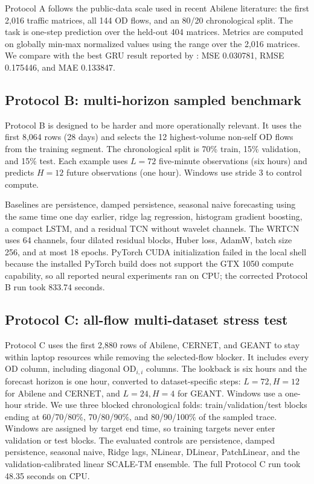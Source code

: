 \documentclass{article}
\begin{document}
Protocol A follows the public-data scale used in recent Abilene literature: the first 2,016 traffic matrices, all 144 OD flows, and an 80/20 chronological split. The task is one-step prediction over the held-out 404 matrices. Metrics are computed on globally min-max normalized values using the range over the 2,016 matrices. We compare with the best GRU result reported by \citet{kablaoui2024images}: MSE 0.030781, RMSE 0.175446, and MAE 0.133847.

\subsection{Protocol B: multi-horizon sampled benchmark}

Protocol B is designed to be harder and more operationally relevant. It uses the first 8,064 rows (28 days) and selects the 12 highest-volume non-self OD flows from the training segment. The chronological split is 70\% train, 15\% validation, and 15\% test. Each example uses $L=72$ five-minute observations (six hours) and predicts $H=12$ future observations (one hour). Windows use stride 3 to control compute.

Baselines are persistence, damped persistence, seasonal naive forecasting using the same time one day earlier, ridge lag regression, histogram gradient boosting, a compact LSTM, and a residual TCN without wavelet channels. The WRTCN uses 64 channels, four dilated residual blocks, Huber loss, AdamW, batch size 256, and at most 18 epochs. PyTorch CUDA initialization failed in the local shell because the installed PyTorch build does not support the GTX 1050 compute capability, so all reported neural experiments ran on CPU; the corrected Protocol B run took 833.74 seconds.

\subsection{Protocol C: all-flow multi-dataset stress test}

Protocol C uses the first 2,880 rows of Abilene, CERNET, and GEANT to stay within laptop resources while removing the selected-flow blocker. It includes every OD column, including diagonal OD$_{i,i}$ columns. The lookback is six hours and the forecast horizon is one hour, converted to dataset-specific steps: $L=72,H=12$ for Abilene and CERNET, and $L=24,H=4$ for GEANT. Windows use a one-hour stride. We use three blocked chronological folds: train/validation/test blocks ending at 60/70/80\%, 70/80/90\%, and 80/90/100\% of the sampled trace. Windows are assigned by target end time, so training targets never enter validation or test blocks. The evaluated controls are persistence, damped persistence, seasonal naive, Ridge lags, NLinear, DLinear, PatchLinear, and the validation-calibrated linear SCALE-TM ensemble. The full Protocol C run took 48.35 seconds on CPU.
\end{document}
